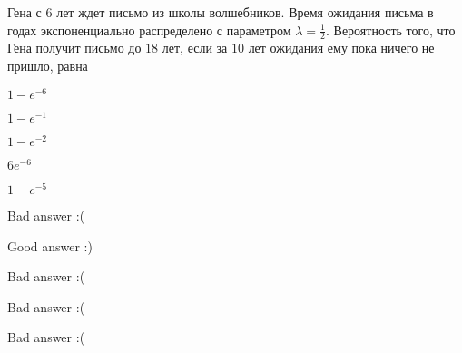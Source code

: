 
\begin{question}
Гена с \(6\) лет ждет письмо из школы волшебников. Время ожидания письма
в годах экспоненциально распределено с параметром
\(\lambda=\frac{1}{2}\). Вероятность того, что Гена получит письмо до
\(18\) лет, если за \(10\) лет ожидания ему пока ничего не пришло, равна
\begin{answerlist}
  \item \(1-e^{-6}\)
  \item \(1-e^{-1}\)
  \item \(1-e^{-2}\)
  \item \(6e^{-6}\)
  \item \(1-e^{-5}\)
\end{answerlist}
\end{question}

\begin{solution}
\begin{answerlist}
  \item Bad answer :(
  \item Good answer :)
  \item Bad answer :(
  \item Bad answer :(
  \item Bad answer :(
\end{answerlist}
\end{solution}


